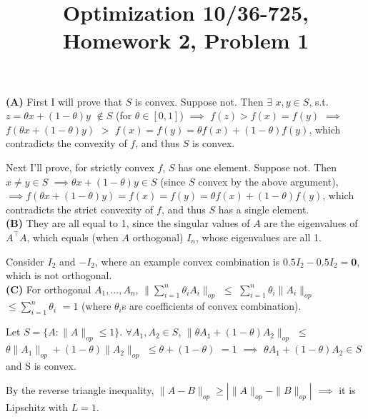 \documentclass{article}
\title{Optimization 10/36-725, 
        Homework 2, Problem 1}
\author{}
\date{}
\begin{document}
\maketitle
\vspace{-5mm}

\textbf{(A)} First I will prove that $S$ is convex. Suppose not. Then $\exists$
$x,y \in S$, s.t. $z = \theta x + (1 - \theta) y$ $\not\in S$ (for $\theta \in
[0,1]$) $\implies$ $f(z) > f(x) = f(y)$ $\implies$ $f(\theta x + (1 -
\theta)y)$ $>$ $f(x) = f(y) = \theta f(x) + (1-\theta)f(y)$, which contradicts
the convexity of $f$, and thus $S$ is convex.

Next I'll prove, for strictly convex $f$, $S$ has one element. Suppose not.
Then $x \neq y \in S$ $\implies \theta x + (1 - \theta)y \in S$ (since $S$
convex by the above argument), $\implies f(\theta x + (1-\theta)y) = f(x) =
f(y) = \theta f(x) + (1-\theta)f(y)$, which contradicts the strict convexity of
$f$, and thus $S$ has a single element.\\


\textbf{(B)} They are all equal to 1, since the singular values of $A$ are the eigenvalues
of $A^{\top}A$, which equals (when $A$ orthogonal) $I_n$, whose eigenvalues are
all 1.

Consider $I_2$ and $-I_2$, where an example convex combination is $0.5 I_2 -
0.5I_2 = \mathbf{0}$, which is not orthogonal.\\


\textbf{(C)} For orthogonal $A_1,\ldots,A_n$, $\| \sum_{i=1}^n \theta_i A_i \|_{op}$ $\leq$
$\sum_{i=1}^n \theta_i \| A_i \|_{op}$ $\leq \sum_{i=1}^n \theta_i$ $= 1$
(where $\theta_i$s are coefficients of convex combination).

Let $S = \{A : \|A\|_{op} \leq 1 \}$. $\forall A_1, A_2 \in S$, $\|\theta A_1 +
(1-\theta)A_2\|_{op}$ $\leq$ $\theta \|A_1\|_{op} + (1-\theta)\|A_2\|_{op}$
$\leq \theta + (1-\theta)$ $=1$ $\implies$ $\theta A_1 + (1-\theta)A_2 \in S$
and S is convex.

By the reverse triangle inequality, $\|A-B\|_{op} \geq \left| \|A\|_{op} -
\|B\|_{op} \right|$ $\implies$ it is Lipschitz with $L=1$.\\
\end{document}
